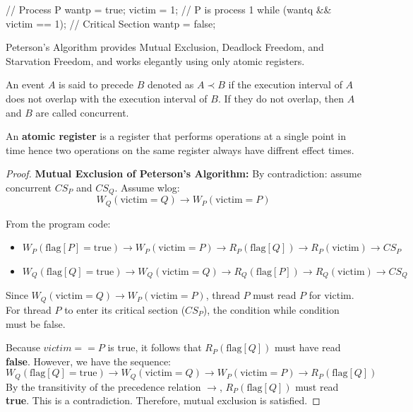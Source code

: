 \begin{codeexample}
// Process P
wantp = true;
victim = 1; // P is process 1
while (wantq && victim == 1);
// Critical Section
wantp = false;
\end{codeexample}

\begin{theorem}
    Peterson's Algorithm provides Mutual Exclusion, Deadlock Freedom, and Starvation Freedom, and works elegantly using only atomic registers.
\end{theorem}

\begin{definition}
    An event $A$ is said to precede $B$ denoted as $A \prec B$ if the execution interval of $A$ does not overlap with the execution interval of $B$. If they do not overlap, then $A$ and $B$ are called concurrent.
\end{definition}

\begin{definition}
    An \textbf{atomic register} is a register that performs operations at a single point in time hence two operations on the same register always have diffrent effect times.
\end{definition}

\begin{proof}
    \textbf{Mutual Exclusion of Peterson's Algorithm:} By contradiction: assume concurrent $CS_P$ and $CS_Q$. Assume wlog: 
    $$W_Q(\text{victim}=Q) \rightarrow W_P(\text{victim}=P)$$

    From the program code:
    \begin{itemize}
        \item $W_P(\text{flag}[P]=\text{true}) \rightarrow W_P(\text{victim}=P) \rightarrow R_P(\text{flag}[Q]) \rightarrow R_P(\text{victim}) \rightarrow CS_P$
        \item $W_Q(\text{flag}[Q]=\text{true}) \rightarrow W_Q(\text{victim}=Q) \rightarrow R_Q(\text{flag}[P]) \rightarrow R_Q(\text{victim}) \rightarrow CS_Q$
    \end{itemize}

    Since $W_Q(\text{victim}=Q) \rightarrow W_P(\text{victim}=P)$, thread $P$ must read $P$ for victim.
    For thread $P$ to enter its critical section ($CS_P$), the condition while condition must be false.

    Because $victim == P$ is true, it follows that $R_P(\text{flag}[Q])$ must have read \textbf{false}.
    However, we have the sequence: 
    $$W_Q(\text{flag}[Q]=\text{true}) \rightarrow W_Q(\text{victim}=Q) \rightarrow W_P(\text{victim}=P) \rightarrow R_P(\text{flag}[Q])$$
    By the transitivity of the precedence relation $\rightarrow$, $R_P(\text{flag}[Q])$ must read \textbf{true}.
    This is a contradiction. Therefore, mutual exclusion is satisfied.
\end{proof}

